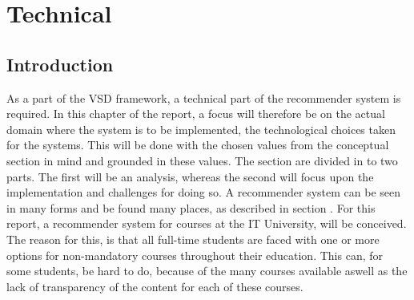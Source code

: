 
 
\section{Technical}

\subsection{Introduction}
As a part of the VSD framework, a technical part of the recommender system is required. In this chapter of the report, a focus will therefore be on the actual domain where the system is to be implemented, the technological choices taken for the systems. This will be done with the chosen values from the conceptual section in mind and grounded in these values. 
The section are divided in to two parts. The first will be an analysis, whereas the second will focus upon the implementation and challenges for doing so. 
A recommender system can be seen in many forms and be found many places, as described in section . For this report, a recommender system for courses at the IT University, will be conceived. The reason for this, is that all full-time students are faced with one or more options for non-mandatory courses throughout their education. This can, for some students, be hard to do, because of the many courses available aswell as the lack of transparency of the content for each of these courses.


